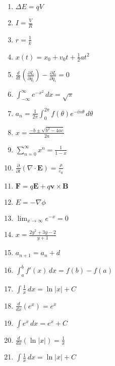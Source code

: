 \documentclass{article}
\begin{document}
\begin{enumerate}
    \item $\Delta E = qV$
    \item $I = \frac{V}{R}$
    \item $r = \frac{1}{k}$
    \item $x(t) = x_0 + v_0 t + \frac{1}{2} a t^2$
    \item $\frac{d}{dt} \left( \frac{\partial L}{\partial \dot{q}_i} \right) - \frac{\partial L}{\partial q_i} = 0$
    \item $\int_{-\infty}^{\infty} e^{-x^2} \, dx = \sqrt{\pi}$
    \item $a_n = \frac{1}{2\pi} \int_{0}^{2\pi} f(\theta)e^{-in\theta} \, d\theta$
    \item $x = \frac{-b \pm \sqrt{b^2 - 4ac}}{2a}$
    \item $\sum_{n=0}^{\infty} x^n = \frac{1}{1-x}$
    \item $\frac{\partial}{\partial t} (\nabla \cdot \mathbf{E}) = \frac{\rho}{\varepsilon_0}$
    \item $\mathbf{F} = q\mathbf{E} + q\mathbf{v} \times \mathbf{B}$
    \item $E = -\nabla \phi$
    \item $\lim_{x\to \infty} e^{-x} = 0$
    \item $x = \frac{2y^2 + 3y - 2}{y+1}$
    \item $a_{n+1} = a_n + d$
    \item $\int_a^b f'(x) \, dx = f(b) - f(a)$
    \item $\int \frac{1}{x} \, dx = \ln |x| + C$
    \item $\frac{d}{dx} (e^x) = e^x$
    \item $\int e^x \, dx = e^x + C$
    \item $\frac{d}{dx} \left( \ln |x| \right) = \frac{1}{x}$
    \item $\int \frac{1}{x} \, dx = \ln |x| + C$
\end{enumerate}
\end{document}
